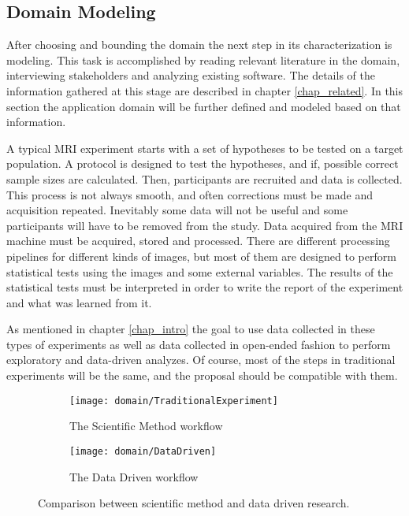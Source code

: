 
%


\subsection{Domain Modeling}

After choosing and bounding the domain the next step in its characterization is modeling. This task is accomplished by reading relevant literature in the domain, interviewing stakeholders and analyzing existing software. The details of the information gathered at this stage are described in chapter \ref{chap_related}. In this section the application domain will be further defined and modeled based on that information.

A typical MRI experiment starts with a set of hypotheses to be tested on a target population. A protocol is designed to test the hypotheses, and if, possible correct sample sizes are calculated. Then, participants are recruited and data is collected. This process is not always smooth, and often corrections must be made and acquisition repeated. Inevitably some data will not be useful and some participants will have to be removed from the study. Data acquired from the MRI machine must be acquired, stored and processed. There are different processing pipelines for different kinds of images, but most of them are designed to perform statistical tests using the images and some external variables. The results of the statistical tests must be interpreted in order to write the report of the experiment and what was learned from it.

As mentioned in chapter \ref{chap_intro} the goal to use data collected in these types of experiments as well as data collected in open-ended fashion to perform exploratory and data-driven analyzes. Of course, most of the steps in traditional experiments will be the same, and the proposal should be compatible with them. 

\begin{figure}
\centering
\begin{subfigure}[b]{0.9\textwidth}
\texttt{[image: domain/TraditionalExperiment]}
\caption{The Scientific Method workflow}	
\end{subfigure}

\begin{subfigure}[b]{0.9\textwidth}
\texttt{[image: domain/DataDriven]}	
\caption{The Data Driven workflow}	
\end{subfigure}

\caption{\label{fig_workflows}Comparison between scientific method and data driven research.}
\end{figure}

